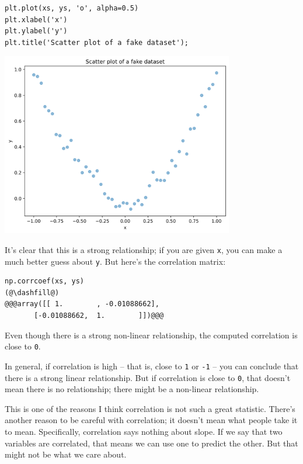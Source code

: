 \begin{lstlisting}[]
plt.plot(xs, ys, 'o', alpha=0.5)
plt.xlabel('x')
plt.ylabel('y')
plt.title('Scatter plot of a fake dataset');
\end{lstlisting}

\begin{center}
\includegraphics[width=4in]{chapters/09_relationships_files/09_relationships_61_0.png}
\end{center}

It's clear that this is a strong relationship; if you are given
\passthrough{\lstinline!x!}, you can make a much better guess about
\passthrough{\lstinline!y!}. But here's the correlation matrix:

\begin{lstlisting}[]
np.corrcoef(xs, ys)
(@\dashfill@)
@@@array([[ 1.        , -0.01088662],
       [-0.01088662,  1.        ]])@@@
\end{lstlisting}

Even though there is a strong non-linear relationship, the computed
correlation is close to \passthrough{\lstinline!0!}.

In general, if correlation is high -- that is, close to
\passthrough{\lstinline!1!} or \passthrough{\lstinline!-1!} -- you can
conclude that there is a strong linear relationship. But if correlation
is close to \passthrough{\lstinline!0!}, that doesn't mean there is no
relationship; there might be a non-linear relationship.

This is one of the reasons I think correlation is not such a great
statistic. There's another reason to be careful with correlation; it
doesn't mean what people take it to mean. Specifically, correlation says
nothing about slope. If we say that two variables are correlated, that
means we can use one to predict the other. But that might not be what we
care about.

